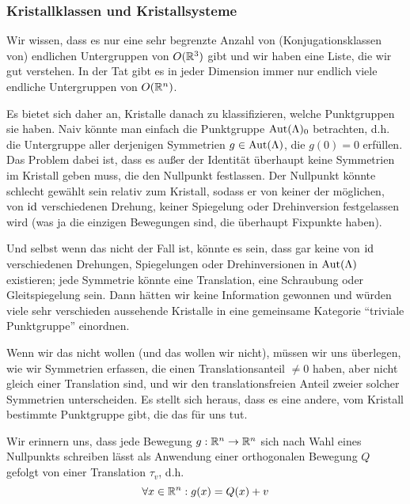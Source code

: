\subsubsection{Kristallklassen und Kristallsysteme}

\begin{remark}
Wir wissen, dass es nur eine sehr begrenzte Anzahl von (Konjugationsklassen von) endlichen Untergruppen von $O(\mathbb{R}^3)$ gibt und wir haben eine Liste, die wir gut verstehen. In der Tat gibt es in jeder Dimension immer nur endlich viele endliche Untergruppen von $O(\mathbb{R}^n)$.

Es bietet sich daher an, Kristalle danach zu klassifizieren, welche Punktgruppen sie haben. Naiv könnte man einfach die Punktgruppe $\operatorname{Aut}(\Lambda)_0$ betrachten, d.h. die Untergruppe aller derjenigen Symmetrien $g\in\operatorname{Aut}(\Lambda)$, die $g(0)=0$ erfüllen. Das Problem dabei ist, dass es außer der Identität überhaupt keine Symmetrien im Kristall geben muss, die den Nullpunkt festlassen. Der Nullpunkt könnte schlecht gewählt sein relativ zum Kristall, sodass er von keiner der möglichen, von $\operatorname{id}$ verschiedenen Drehung, keiner Spiegelung oder Drehinversion festgelassen wird (was ja die einzigen Bewegungen sind, die überhaupt Fixpunkte haben).

Und selbst wenn das nicht der Fall ist, könnte es sein, dass gar keine von $\operatorname{id}$ verschiedenen Drehungen, Spiegelungen oder Drehinversionen in $\operatorname{Aut}(\Lambda)$ existieren; jede Symmetrie könnte eine Translation, eine Schraubung oder Gleitspiegelung sein. Dann hätten wir keine Information gewonnen und würden viele sehr verschieden aussehende Kristalle in eine gemeinsame Kategorie \enquote{triviale Punktgruppe} einordnen.

Wenn wir das nicht wollen (und das wollen wir nicht), müssen wir uns überlegen, wie wir Symmetrien erfassen, die einen Translationsanteil $\neq 0$ haben, aber nicht gleich einer Translation sind, und wir den translationsfreien Anteil zweier solcher Symmetrien unterscheiden. Es stellt sich heraus, dass es eine andere, vom Kristall bestimmte Punktgruppe gibt, die das für uns tut.
\end{remark}

\begin{remark}
Wir erinnern uns, dass jede Bewegung $g:\mathbb{R}^n\to\mathbb{R}^n$ sich nach Wahl eines Nullpunkts schreiben lässt als Anwendung einer orthogonalen Bewegung $Q$ gefolgt von einer Translation $\tau_v$, d.h.
\[\forall x\in\mathbb{R}^n: g(x)=Q(x)+v\]
\end{remark}

